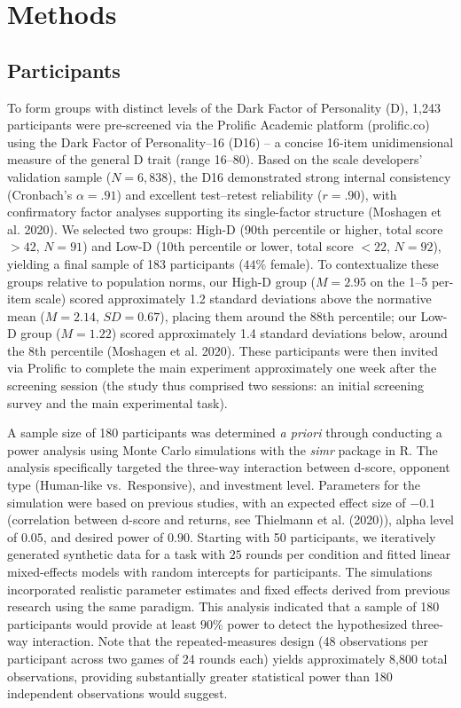 \documentclass[
]{article}
\begin{document}
\section{Methods}\label{methods}

\subsection{Participants}\label{participants}

To form groups with distinct levels of the Dark Factor of Personality (D), 1,243 participants were pre‑screened via the Prolific Academic platform (prolific.co) using the Dark Factor of Personality--16 (D16) -- a concise 16‑item unidimensional measure of the general D trait (range 16--80).
Based on the scale developers' validation sample (\(N = 6{,}838\)), the D16 demonstrated strong internal consistency (Cronbach's \(\alpha = .91\)) and excellent test--retest reliability (\(r = .90\)), with confirmatory factor analyses supporting its single-factor structure (Moshagen et al. 2020).
We selected two groups: High-D (90th percentile or higher, total score \(> 42\), \(N = 91\)) and Low-D (10th percentile or lower, total score \(< 22\), \(N = 92\)), yielding a final sample of 183 participants (\(44\%\) female).
To contextualize these groups relative to population norms, our High-D group (\(M = 2.95\) on the 1--5 per-item scale) scored approximately 1.2 standard deviations above the normative mean (\(M = 2.14\), \(SD = 0.67\)), placing them around the 88th percentile; our Low-D group (\(M = 1.22\)) scored approximately 1.4 standard deviations below, around the 8th percentile (Moshagen et al. 2020).
These participants were then invited via Prolific to complete the main experiment approximately one week after the screening session (the study thus comprised two sessions: an initial screening survey and the main experimental task).

A sample size of 180 participants was determined \emph{a priori} through conducting a power analysis using Monte Carlo simulations with the \emph{simr} package in R.
The analysis specifically targeted the three-way interaction between d-score, opponent type (Human-like vs.~Responsive), and investment level.
Parameters for the simulation were based on previous studies, with an expected effect size of \(-0.1\) (correlation between d-score and returns, see Thielmann et al. (2020)), alpha level of \(0.05\), and desired power of \(0.90\).
Starting with 50 participants, we iteratively generated synthetic data for a task with \(25\) rounds per condition and fitted linear mixed-effects models with random intercepts for participants.
The simulations incorporated realistic parameter estimates and fixed effects derived from previous research using the same paradigm.
This analysis indicated that a sample of 180 participants would provide at least \(90\%\) power to detect the hypothesized three-way interaction.
Note that the repeated-measures design (48 observations per participant across two games of 24 rounds each) yields approximately 8,800 total observations, providing substantially greater statistical power than 180 independent observations would suggest.
\end{document}
